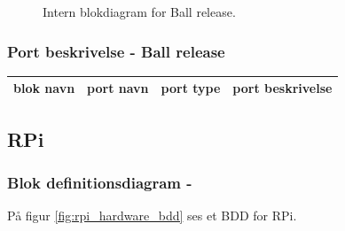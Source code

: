 \documentclass[Arkitektur/System_main.tex]{subfiles}
\begin{document}
\begin{figure}[H]
    \centering
    \caption{Intern blokdiagram for Ball release.}
    \label{fig:ball_release_hardware_ibd}
\end{figure}

\subsubsection{Port beskrivelse - Ball release} \label{sec:ball_release_hardware_ports}


\begin{table}[]
\begin{tabular}{|l|l|l|l|}
\hline
blok navn & port navn & port type & port beskrivelse \\ \hline
\end{tabular}
\end{table}




\subsection{RPi} \label{sec:rpi_hardware}
\subsubsection{Blok definitionsdiagram - } \label{sec:rpi_hardware_bdd}

På figur \ref{fig:rpi_hardware_bdd} ses et BDD for RPi.
\end{document}
